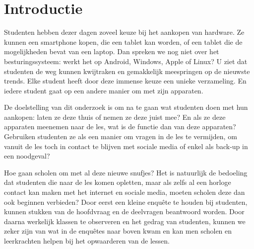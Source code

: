 \documentclass[fleqn,10pt]{voorstel}
\affiliation{\textbf{Contact:}
  \textsuperscript{1} \href{mailto:laurens.bracke.w1090@student.hogent.be}{laurens.bracke.w1090@student.hogent.be}}
\begin{document}
\flushbottom %
\maketitle %
\tableofcontents %
\thispagestyle{empty} %



\section{Introductie} %
\label{sec:introductie}

Studenten hebben dezer dagen zoveel keuze bij het aankopen van hardware. Ze kunnen een smartphone kopen, die een tablet kan worden, of een tablet die de mogelijkheden bevat van een laptop. Dan spreken we nog niet over het besturingssysteem: werkt het op Android, Windows, Apple of Linux? U ziet dat studenten de weg kunnen kwijtraken en gemakkelijk meespringen op de nieuwste trends. Elke student heeft door deze immense keuze een unieke verzameling. En iedere student gaat op een andere manier om met zijn apparaten.

De doelstelling van dit onderzoek is om na te gaan wat studenten doen met hun aankopen: laten ze deze thuis of nemen ze deze juist mee? En als ze deze apparaten meenemen naar de les, wat is de functie dan van deze apparaten? Gebruiken studenten ze als een manier om vragen in de les te vermijden, om vanuit de les toch in contact te blijven met sociale media of enkel als back-up in een noodgeval?

Hoe gaan scholen om met al deze nieuwe snufjes? Het is natuurlijk de bedoeling dat studenten die naar de les komen opletten, maar als zelfs al een horloge contact kan maken met het internet en sociale media, moeten scholen deze dan ook beginnen verbieden? Door eerst een kleine enquête te houden bij studenten, kunnen stukken van de hoofdvraag en de deelvragen beantwoord worden. Door daarna werkelijk klassen te observeren en het gedrag van studenten, kunnen we zeker zijn van wat in de enquêtes naar boven kwam en kan men scholen en leerkrachten helpen bij het opwaarderen van de lessen.
\end{document}
